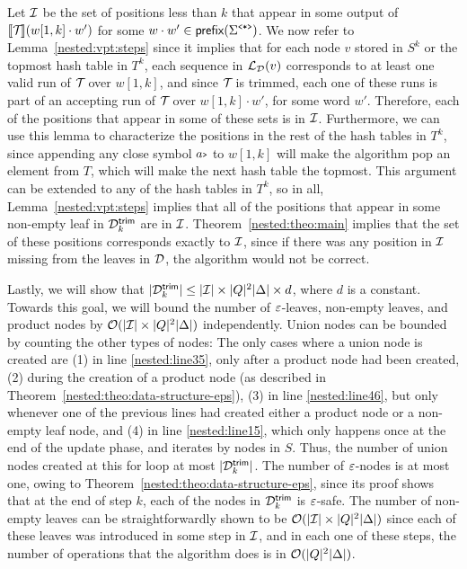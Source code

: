 Let $\mathcal{I}$ be the set of positions less than $k$ that appear in some output of ${\llbracket{\mathcal{T}\!}\rrbracket}(w[1,k] \cdot w')$ for some $w \cdot w'\in \textsf{prefix}(\Sigma^{\texttt{<*>}})$. We now refer to Lemma~\ref{nested:vpt:steps} since it implies that for each node $v$ stored in $S^k$ or the topmost hash table in $T^k$, each sequence in $\mathcal{L}_{\mathcal{D}}(v)$ corresponds to at least one valid run of $\mathcal{T}\!$ over $w[1,k]$, and since $\mathcal{T}\!$ is trimmed, each one of these runs is part of an accepting run of $\mathcal{T}\!$ over $w[1,k] \cdot w'$, for some word $w'$. Therefore, each of the positions that appear in some of these sets is in $\mathcal{I}$. Furthermore, we can use this lemma to characterize the positions in the rest of the hash tables in $T^k$, since appending any close symbol $a{\scriptsize\texttt{>}}$ to $w[1,k]$ will make the algorithm pop an element from $T$, which will make the next hash table the topmost. This argument can be extended to any of the hash tables in $T^k$, so in all, Lemma~\ref{nested:vpt:steps} implies that all of the positions that appear in some non-empty leaf in $\mathcal{D}^{\textsf{trim}}_k $ are in $\mathcal{I}$. Theorem~\ref{nested:theo:main} implies that the set of these positions corresponds exactly to $\mathcal{I}$, since if there was any position in $\mathcal{I}$ missing from the leaves in $\mathcal{D}$, the algorithm would not be correct.

Lastly, we will show that $| \mathcal{D}^{\textsf{trim}}_k | \leq | \mathcal{I} | \times |Q|^2|\Delta| \times d$, where $d$ is a constant. Towards this goal, we will bound the number of $\varepsilon$-leaves, non-empty leaves, and product nodes by $\mathcal{O}(| \mathcal{I} | \times |Q|^2|\Delta|)$ independently. Union nodes can be bounded by counting the other types of nodes: The only cases where a union node is created are (1) in line \ref{nested:line35}, only after a product node had been created, (2) during the creation of a product node (as described in Theorem~\ref{nested:theo:data-structure-eps}), (3) in line \ref{nested:line46}, but only whenever one of the previous lines had created either a product node or a non-empty leaf node, and (4) in line \ref{nested:line15}, which only happens once at the end of the update phase, and iterates by nodes in $S$. Thus, the number of union nodes created at this for loop at most $| \mathcal{D}^{\textsf{trim}}_k |$. The number of $\varepsilon$-nodes is at most one, owing to Theorem~\ref{nested:theo:data-structure-eps}, since its proof shows that at the end of step $k$, each of the nodes in $\mathcal{D}^{\textsf{trim}}_k$ is $\varepsilon$-safe. The number of non-empty leaves can be straightforwardly shown to be $\mathcal{O}(| \mathcal{I} | \times |Q|^2|\Delta|)$ since each of these leaves was introduced in some step in $\mathcal{I}$, and in each one of these steps, the number of operations that the algorithm does is in $\mathcal{O}(|Q|^2|\Delta|)$. 

